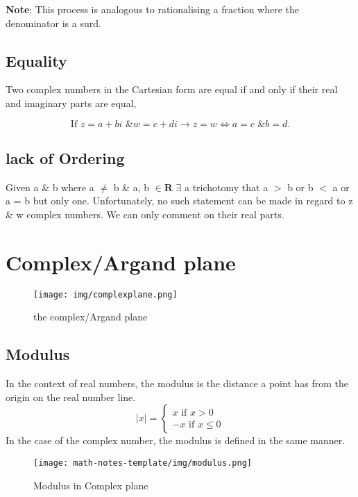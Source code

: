 \documentclass[oneside]{book}
\begin{document}

\textbf{Note}: This process is analogous to rationalising a fraction where the denominator is a surd.

\subsection*{Equality}
Two complex numbers in the Cartesian form are equal if and only if their real and imaginary parts are equal,

\[
\text{If } z = a + bi \text{ \& } w = c + di \rightarrow z = w \iff a = c \text{ \& } b = d. 
\]

\subsection*{lack of Ordering}
Given a \& b where a $\neq$ b \& a, b $\in \mathbf{R}$ $\exists$ a trichotomy that a $>$ b or b $<$ a or a = b but only one. Unfortunately, no such statement can be made in regard to z \& w complex numbers. We can only comment on their real parts.

\section*{Complex/Argand plane}
\begin{figure}[H]
    \center
    \texttt{[image: img/complexplane.png]}
    \caption{the complex/Argand plane}
\end{figure}

\subsection*{Modulus}
In the context of real numbers, the modulus is the distance a point has from the origin on the real number line.
\[
|x| = 
\begin{cases}
    x \text{ if } x > 0 \\ 
    -x \text{ if } x \leq 0
\end{cases}
\]
In the case of the complex number, the modulus is defined in the same manner.

\begin{figure}[H]
    \centering
    \texttt{[image: math-notes-template/img/modulus.png]}
    \caption{Modulus in Complex plane}
    \label{fig:enter-label}
\end{figure}
\end{document}
